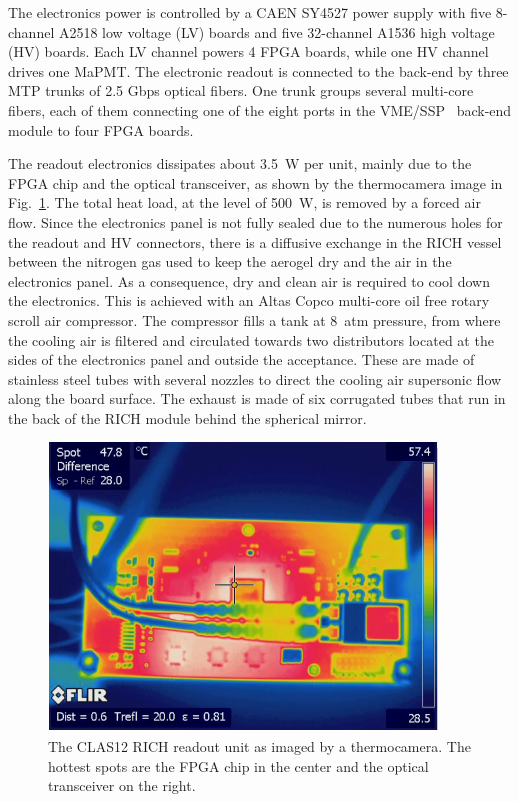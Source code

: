 \documentclass[5p,times,twocolumn]{elsarticle}
\begin{document}
The electronics power is controlled by a CAEN SY4527 power supply with five 8-channel A2518 low voltage (LV) boards and five
32-channel A1536 high voltage (HV) boards. Each LV channel powers 4 FPGA boards, while one HV channel drives one MaPMT. The
electronic readout is connected to the back-end by three MTP trunks of 2.5 Gbps optical fibers. One trunk groups
several multi-core fibers, each of them connecting one of the eight ports in the VME/SSP~\cite{daq-nim} back-end
module to four FPGA boards.

The readout electronics dissipates about 3.5~W per unit, mainly due to the FPGA chip and the optical transceiver, as
shown by the thermocamera image in Fig.~\ref{Fig:EleTile}. The total heat load, at the level of 500~W, is removed by
a forced air flow. Since the electronics panel is not fully sealed due to the numerous holes for the readout and HV
connectors, there is a diffusive exchange in the RICH vessel between the nitrogen gas used to keep the aerogel dry
and the air in the electronics panel. As a consequence, dry and clean air is required to cool down the electronics. This
is achieved with an Altas Copco multi-core oil free rotary scroll air compressor. The compressor fills a tank at 8~atm
pressure, from where the cooling air is filtered and circulated towards two distributors located at the sides of the
electronics panel and outside the acceptance. These are made of stainless steel tubes with several nozzles to direct
the cooling air supersonic flow along the board surface. The exhaust is made of six corrugated tubes that run in the
back of the RICH module behind the spherical mirror.

\begin{figure}[t]
\begin{center}
\includegraphics[width=0.90\columnwidth]{FPGA_heat.pdf}
\end{center}
\caption{The CLAS12 RICH readout unit as imaged by a thermocamera. The hottest spots are the FPGA chip in the
  center and the optical transceiver on the right.}
\label{Fig:EleTile}
\end{figure}
\end{document}
